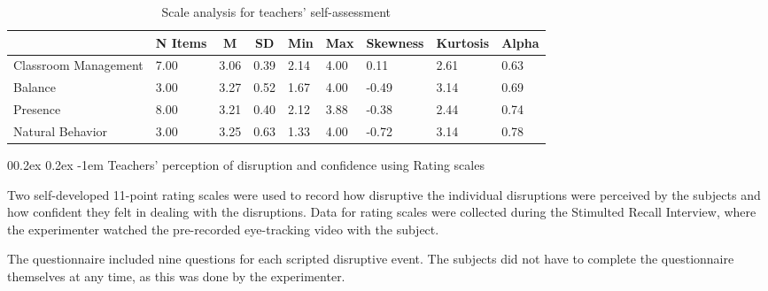 \documentclass[
  man]{apa6}
\makeatletter
\let\oldparagraph\paragraph
\renewcommand{\paragraph}{
    \@ifstar
      \xxxParagraphStar
      \xxxParagraphNoStar
  }
\newcommand{\xxxParagraphStar}[1]{\oldparagraph*{#1}\mbox{}}
\newcommand{\xxxParagraphNoStar}[1]{\oldparagraph{#1}\mbox{}}
\renewcommand{\paragraph}{\@startsection{paragraph}{4}{\parindent}%
  {0\baselineskip \@plus 0.2ex \@minus 0.2ex}%
  {-1em}%
  {\normalfont\normalsize\bfseries\itshape\typesectitle}}
\makeatother
\begin{document}
\begin{table}[h]

\begin{center}
\begin{threeparttable}

\caption{\label{tab:presence_questionnaire}Scale analysis for teachers' self-assessment}

\tiny{

\begin{tabular}{lllllllll}
\toprule
 & \multicolumn{1}{c}{N Items} & \multicolumn{1}{c}{M} & \multicolumn{1}{c}{SD} & \multicolumn{1}{c}{Min} & \multicolumn{1}{c}{Max} & \multicolumn{1}{c}{Skewness} & \multicolumn{1}{c}{Kurtosis} & \multicolumn{1}{c}{Alpha}\\
\midrule
Classroom Management & 7.00 & 3.06 & 0.39 & 2.14 & 4.00 & 0.11 & 2.61 & 0.63\\
Balance & 3.00 & 3.27 & 0.52 & 1.67 & 4.00 & -0.49 & 3.14 & 0.69\\
Presence & 8.00 & 3.21 & 0.40 & 2.12 & 3.88 & -0.38 & 2.44 & 0.74\\
Natural Behavior & 3.00 & 3.25 & 0.63 & 1.33 & 4.00 & -0.72 & 3.14 & 0.78\\
\bottomrule
\end{tabular}

}

\end{threeparttable}
\end{center}

\end{table}

\paragraph{Teachers' perception of disruption and confidence using Rating scales}\label{teachers-perception-of-disruption-and-confidence-using-rating-scales}

Two self-developed 11-point rating scales were used to record how disruptive the individual disruptions were perceived by the subjects and how confident they felt in dealing with the disruptions. Data for rating scales were collected during the Stimulted Recall Interview, where the experimenter watched the pre-recorded eye-tracking video with the subject.

The questionnaire included nine questions for each scripted disruptive event. The subjects did not have to complete the questionnaire themselves at any time, as this was done by the experimenter.
\end{document}
